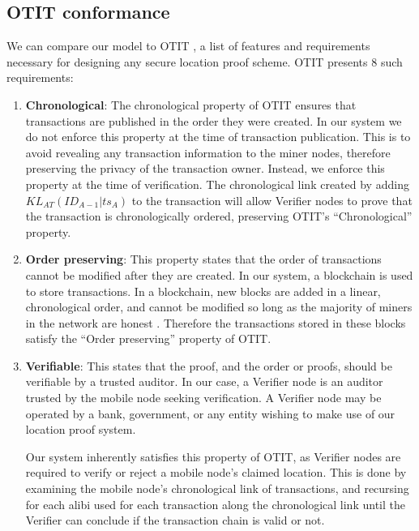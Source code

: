 \documentclass[12pt]{article}
\begin{document}
\subsection{OTIT conformance}
We can compare our model to OTIT \cite{otit}, a list of features and requirements necessary for designing any secure location proof scheme. OTIT presents 8 such requirements:
\begin{enumerate}
\item[] \textbf{Chronological}: The chronological property of OTIT ensures that transactions are published in the order they were created. In our system we do not enforce this property at the time of transaction publication. This is to avoid revealing any transaction information to the miner nodes, therefore preserving the privacy of the transaction owner. Instead, we enforce this property at the time of verification. The chronological link created by adding $KL_{AT}(ID_{A-1}|ts_A)$ to the transaction will allow Verifier nodes to prove that the transaction is chronologically ordered, preserving OTIT's ``Chronological'' property.

\item[] \textbf{Order preserving}: This property states that the order of transactions cannot be modified after they are created. In our system, a blockchain is used to store transactions. In a blockchain, new blocks are added in a linear, chronological order, and cannot be modified so long as the majority of miners in the network are honest \cite{blueprint}. Therefore the transactions stored in these blocks satisfy the ``Order preserving'' property of OTIT. %

\item[] \textbf{Verifiable}: This states that the proof, and the order or proofs, should be verifiable by a trusted auditor. In our case, a Verifier node is an auditor trusted by the mobile node seeking verification. A Verifier node may be operated by a bank, government, or any entity wishing to make use of our location proof system.

Our system inherently satisfies this property of OTIT, as Verifier nodes are required to verify or reject a mobile node's claimed location. This is done by examining the mobile node's chronological link of transactions, and recursing for each alibi used for each transaction along the chronological link until the Verifier can conclude if the transaction chain is valid or not.


\end{enumerate}
\end{document}
